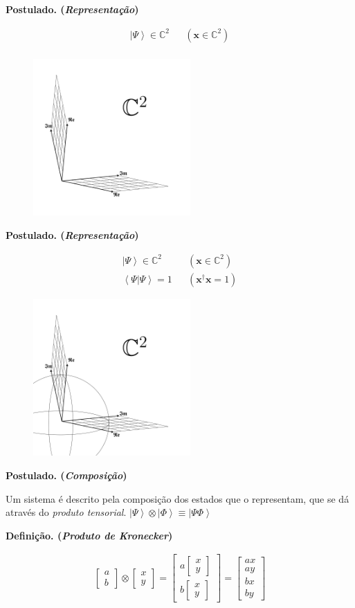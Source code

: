 \documentclass[t]{beamer}
\newcommand{\postulado}[1]{%
	\textbf{Postulado. (\emph{#1})\\}
}
\newcommand{\definicao}[1]{%
	\textbf{Definição. (\emph{#1})\\}
}
\newcommand{\vetor}[2]{\ensuremath{
\left[\begin{matrix}
#1 \\
#2
\end{matrix}\right]
}
}
\newcommand{\vetorx}[4]{\ensuremath{
\left[\begin{matrix}
#1 \\
#2 \\
#3 \\
#4
\end{matrix}\right]
}
}
\newcommand{\ket}[1]{\ensuremath{\left|#1\right\rangle}}
\newcommand{\braket}[2]{\ensuremath{\left\langle#1|#2\right\rangle}}
\begin{document}
	\begin{frame}{\subsecname}
		\postulado{Representação}
		\begin{align*}
			\ket{\Psi} \in \mathbb{C}^2 && (\mathbf{x} \in \mathbb{C}^2)\\
		\end{align*}
		\vspace{-1cm} 
		\begin{figure}[H]
			\includegraphics[width=6cm]{c2.pdf}
		\end{figure}
	\end{frame}
	
	\begin{frame}{\subsecname}
		\postulado{Representação}
		\begin{align*}
			\ket{\Psi} \in \mathbb{C}^2 && (\mathbf{x} \in \mathbb{C}^2)\\
			\braket{\Psi}{\Psi} = 1 && (\mathbf{x}^{\dagger} \mathbf{x} = 1)
		\end{align*}
		\vspace{-1cm}
		\begin{figure}[H]
			\includegraphics[width=6cm]{c2-sphere.pdf}
		\end{figure}
	\end{frame}

	\begin{frame}{\subsecname}
		\postulado{Composição}
		Um sistema é descrito pela composição dos estados que o representam, que se dá através do \emph{produto tensorial}.
		$\ket{\Psi} \otimes \ket{\Phi} \equiv \ket{\Psi\Phi}$
		
		\definicao{Produto de Kronecker}
		
		
		
		\begin{align*}
		\vetor{a}{b} \otimes \vetor{x}{y} = \vetor{a \vetor{x}{y}}{b \vetor{x}{y}} = \vetorx{ax}{ay}{bx}{by}
		\end{align*}
	\end{frame}
	
\end{document}
